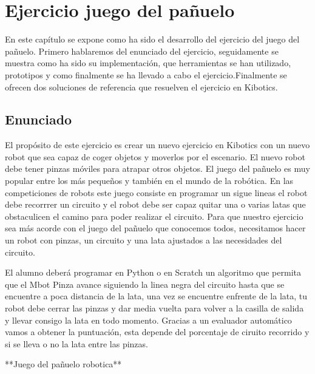 \chapter{Ejercicio juego del pañuelo} \label{gripper}
En este capítulo se expone como ha sido el desarrollo del ejercicio del juego del pañuelo. Primero hablaremos del enunciado del ejercicio, seguidamente se muestra como ha sido su implementación, que herramientas se han utilizado, prototipos y como finalmente se ha llevado a cabo el ejercicio.Finalmente se ofrecen dos soluciones de referencia que resuelven el ejercicio en Kibotics.

\section{Enunciado}
El propósito de este ejercicio es crear un nuevo ejercicio en Kibotics con un nuevo robot que sea capaz de coger objetos y moverlos por el escenario. El nuevo robot debe tener pinzas móviles para atrapar otros objetos. El juego del pañuelo es muy popular entre los más pequeños y también en el mundo de la robótica. En las competiciones de robots este juego consiste en programar un sigue lineas el robot debe recorrrer un circuito y el robot debe ser capaz quitar una o varias latas que obstaculicen el camino para poder realizar el circuito. Para que nuestro ejercicio sea más acorde con el juego del pañuelo que conocemos todos, necesitamos hacer un robot con pinzas, un circuito y una lata ajustados a las necesidades del circuito.

El alumno deberá programar en Python o en Scratch un algoritmo que permita que el Mbot Pinza avance siguiendo la linea negra del circuito hasta que se encuentre a poca distancia de la lata, una vez se encuentre enfrente de la lata, tu robot debe cerrar las pinzas y dar media vuelta para volver a la casilla de salida y  llevar consigo la lata en todo momento. Gracias a un evaluador automático vamos a obtener la puntuación, esta depende del porcentaje de ciruito recorrido y si se lleva o no la lata entre las pinzas.


**Juego del pañuelo robotica**
